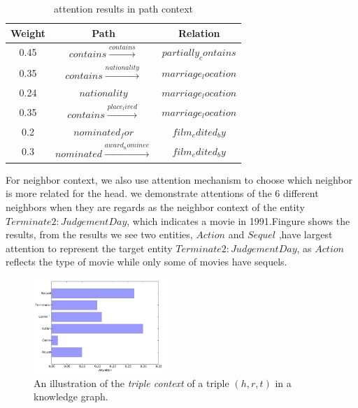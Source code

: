 \begin{table}
 \centering
 \caption{attention results in path context}
  \label{Attention Results in Path Context}
\begin{tabular}{c|c|c}
  \hline
  Weight & Path  & Relation \\
  \hline
  0.45 &  $contains \xrightarrow{contains}$ & $partially_contains$ \\
  0.35 & $contains \xrightarrow{nationality}$ & $marriage_location$ \\
  0.24 & $nationality$ & $marriage_location$ \\
  0.35 & $contains \xrightarrow{place_lived}$ & $marriage_location$ \\
  0.2 & $nominated_for$ & $film_edited_by$\\
  0.3 & $nominated \xrightarrow{award_nominee}$ & $film_edited_by$\\
  \hline
\end{tabular}
\end{table}

For neighbor context, we also use attention mechanism to choose which neighbor is more related for the head. we demonstrate attentions of the 6 different neighbors when they are regards as the neighbor context of the entity $Terminate2:JudgementDay$, which indicates a movie in 1991.Fingure shows the results, from the results we see two entities, $Action$ and $Sequel$ ,have largest attention to represent the target entity $Terminate2:JudgementDay$, as $Action$  reflects the type of movie while only some of movies have sequels.
\begin{figure}
  \includegraphics[width=0.45\textwidth]{pic2.png}
  \caption{An illustration of the \emph{triple context} of a triple $(h,r,t)$ in a knowledge graph.}
  \label{pic2}
\end{figure}








